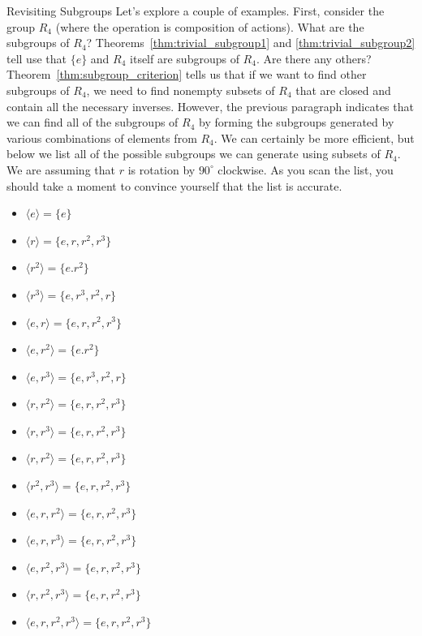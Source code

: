 \begin{section}{Revisiting Subgroups}
Let's explore a couple of examples.  First, consider the group $R_4$ (where the operation is composition of actions).  What are the subgroups of $R_4$?  Theorems~\ref{thm:trivial_subgroup1} and \ref{thm:trivial_subgroup2} tell use that $\{e\}$ and $R_4$ itself are subgroups of $R_4$.  Are there any others?  Theorem~\ref{thm:subgroup_criterion} tells us that if we want to find other subgroups of $R_4$, we need to find nonempty subsets of $R_4$ that are closed and contain all the necessary inverses.  However, the previous paragraph indicates that we can find all of the subgroups of $R_4$ by forming the subgroups generated by various combinations of elements from $R_4$.  We can certainly be more efficient, but below we list all of the possible subgroups we can generate using subsets of $R_4$.  We are assuming that $r$ is rotation by $90^{\circ}$ clockwise.  As you scan the list, you should take a moment to convince yourself that the list is accurate.
\begin{multicols}{2}
\begin{itemize}
\item[] $\langle e \rangle = \{e\}$
\item[] $\langle r \rangle  = \{e,r,r^2,r^3\}$
\item[] $\langle r^2 \rangle  = \{e.r^2\}$
\item[] $\langle r^3 \rangle  = \{e,r^3,r^2,r\}$
\item[] $\langle e,r \rangle  = \{e,r,r^2,r^3\}$
\item[] $\langle e,r^2 \rangle  = \{e.r^2\}$
\item[] $\langle e,r^3 \rangle  = \{e,r^3,r^2,r\}$
\item[] $\langle r,r^2 \rangle  = \{e,r,r^2,r^3\}$
\item[] $\langle r,r^3 \rangle  = \{e,r,r^2,r^3\}$
\item[] $\langle r,r^2 \rangle  = \{e,r,r^2,r^3\}$
\item[] $\langle r^2,r^3 \rangle  = \{e,r,r^2,r^3\}$
\item[] $\langle e,r,r^2 \rangle  = \{e,r,r^2,r^3\}$
\item[] $\langle e,r,r^3 \rangle  = \{e,r,r^2,r^3\}$
\item[] $\langle e,r^2,r^3 \rangle  = \{e,r,r^2,r^3\}$
\item[] $\langle r,r^2,r^3 \rangle  = \{e,r,r^2,r^3\}$
\item[] $\langle e,r,r^2,r^3 \rangle = \{e,r,r^2,r^3\}$
\end{itemize}
\end{multicols}

\end{section}
